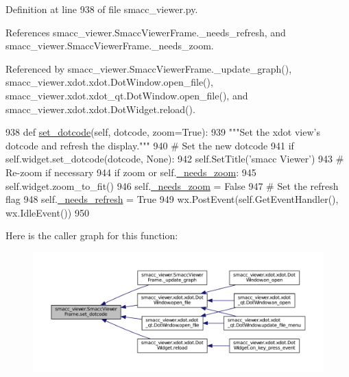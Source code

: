 Definition at line 938 of file smacc\+\_\+viewer.\+py.



References smacc\+\_\+viewer.\+Smacc\+Viewer\+Frame.\+\_\+needs\+\_\+refresh, and smacc\+\_\+viewer.\+Smacc\+Viewer\+Frame.\+\_\+needs\+\_\+zoom.



Referenced by smacc\+\_\+viewer.\+Smacc\+Viewer\+Frame.\+\_\+update\+\_\+graph(), smacc\+\_\+viewer.\+xdot.\+xdot.\+Dot\+Window.\+open\+\_\+file(), smacc\+\_\+viewer.\+xdot.\+xdot\+\_\+qt.\+Dot\+Window.\+open\+\_\+file(), and smacc\+\_\+viewer.\+xdot.\+xdot.\+Dot\+Widget.\+reload().


\begin{DoxyCode}
938     \textcolor{keyword}{def }\hyperlink{classsmacc__viewer_1_1SmaccViewerFrame_ad10d7cac9a3e4c49d23ed1bc8f661b5f}{set\_dotcode}(self, dotcode, zoom=True):
939         \textcolor{stringliteral}{"""Set the xdot view's dotcode and refresh the display."""}
940         \textcolor{comment}{# Set the new dotcode}
941         \textcolor{keywordflow}{if} self.widget.set\_dotcode(dotcode, \textcolor{keywordtype}{None}):
942             self.SetTitle(\textcolor{stringliteral}{'smacc Viewer'})
943             \textcolor{comment}{# Re-zoom if necessary}
944             \textcolor{keywordflow}{if} zoom \textcolor{keywordflow}{or} self.\hyperlink{classsmacc__viewer_1_1SmaccViewerFrame_a2307d88cbcee116cf8a6fa2201aedc44}{\_needs\_zoom}:
945                 self.widget.zoom\_to\_fit()
946                 self.\hyperlink{classsmacc__viewer_1_1SmaccViewerFrame_a2307d88cbcee116cf8a6fa2201aedc44}{\_needs\_zoom} = \textcolor{keyword}{False}
947             \textcolor{comment}{# Set the refresh flag}
948             self.\hyperlink{classsmacc__viewer_1_1SmaccViewerFrame_a42ba63ae6741b2ced224cc0f8aa48bff}{\_needs\_refresh} = \textcolor{keyword}{True}
949             wx.PostEvent(self.GetEventHandler(), wx.IdleEvent())
950 
\end{DoxyCode}


Here is the caller graph for this function\+:
\nopagebreak
\begin{figure}[H]
\begin{center}
\leavevmode
\includegraphics[width=350pt]{classsmacc__viewer_1_1SmaccViewerFrame_ad10d7cac9a3e4c49d23ed1bc8f661b5f_icgraph}
\end{center}
\end{figure}


